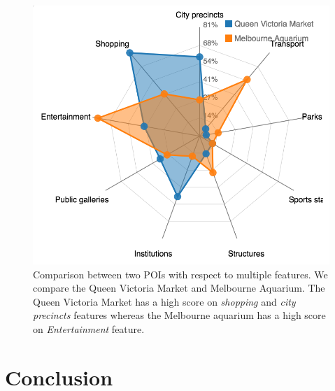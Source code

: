 \documentclass[sigconf]{acmart}
\begin{document}
\begin{figure}[t!]
\includegraphics[width=0.8\linewidth]{figure/sample_radar.png}
\caption{Comparison between two POIs with respect to multiple features. We compare the Queen Victoria Market and Melbourne Aquarium. The Queen Victoria Market has a high score on \textit{shopping} and \textit{city precincts} features whereas the Melbourne aquarium has a high score on \textit{Entertainment} feature.}
\label{fig:radar}
\end{figure}


\section{Conclusion}



 
\end{document}
